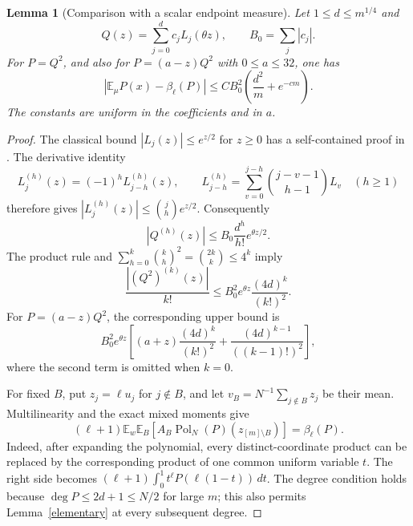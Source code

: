 \documentclass[11pt]{article}
\newtheorem{lemma}{Lemma}
\newcommand{\E}{\mathbb E}
\newcommand{\Pol}{\operatorname{Pol}}
\begin{document}
\begin{lemma}[Comparison with a scalar endpoint measure]\label{comparison}
Let $1\le d\le m^{1/4}$ and
\[
 Q(z)=\sum_{j=0}^d c_jL_j(\theta z),\qquad
 B_0=\sum_j|c_j|.
\]
For $P=Q^2$, and also for $P=(a-z)Q^2$ with $0\le a\le32$, one has
\[
 \left|\E_\mu P(x)-\beta_\ell(P)\right|
 \le C B_0^2\left(\frac{d^2}{m}+e^{-cm}\right).
\tag{*}
\]
The constants are uniform in the coefficients and in $a$.
\end{lemma}
\begin{proof}
The classical bound $|L_j(z)|\le e^{z/2}$ for $z\ge0$ has a
self-contained proof in
.
The derivative identity
\[
 L_j^{(h)}(z)=(-1)^hL_{j-h}^{(h)}(z),\qquad
 L_{j-h}^{(h)}=\sum_{v=0}^{j-h}\binom{j-v-1}{h-1}L_v
 \quad(h\ge1)
\]
therefore gives $|L_j^{(h)}(z)|\le\binom jh e^{z/2}$.
Consequently
\[
 |Q^{(h)}(z)|\le B_0\frac{d^h}{h!}e^{\theta z/2}.
\]
The product rule and
$\sum_{h=0}^k\binom kh^2=\binom{2k}k\le4^k$ imply
\begin{equation}\label{squarederivatives}
 \frac{|(Q^2)^{(k)}(z)|}{k!}
 \le B_0^2 e^{\theta z}\frac{(4d)^k}{(k!)^2}.
\end{equation}
For $P=(a-z)Q^2$, the corresponding upper bound is
\begin{equation}\label{linear-squarederivatives}
 B_0^2 e^{\theta z}\left[
  (a+z)\frac{(4d)^k}{(k!)^2}
  +\frac{(4d)^{k-1}}{((k-1)!)^2}\right],
\end{equation}
where the second term is omitted when $k=0$.

For fixed $B$, put $z_j=\ell u_j$ for $j\notin B$, and let
$v_B=N^{-1}\sum_{j\notin B}z_j$ be their mean.
Multilinearity and the exact mixed moments give
\begin{equation}\label{exactpolarization}
 (\ell+1)\E_w\E_B\left[A_B\Pol_N(P)(z_{[m]\setminus B})\right]
       =\beta_\ell(P).
\end{equation}
Indeed, after expanding the polynomial, every distinct-coordinate
product can be replaced by the corresponding product of one common
uniform variable $t$. The right side becomes
$(\ell+1)\int_0^1t^\ell P(\ell(1-t))\,dt$.
The degree condition holds because $\deg P\le2d+1\le N/2$ for large $m$;
this also permits Lemma~\ref{elementary} at every subsequent degree.


\end{proof}
\end{document}
